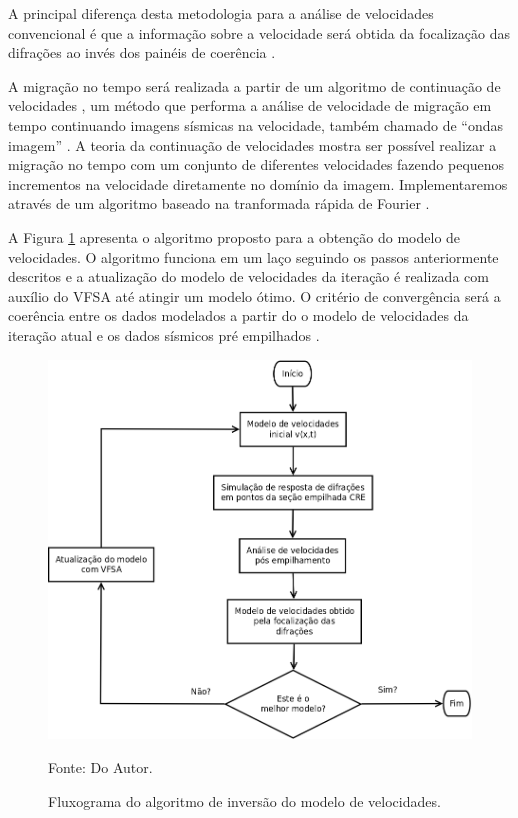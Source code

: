 A principal diferença desta metodologia para a análise
de velocidades convencional é que a informação sobre a velocidade
será obtida da focalização das difrações ao invés dos painéis de coerência \cite{sep_dif}.

A migração no tempo será realizada a partir de um algoritmo de continuação de velocidades \cite{fomel2003a},
um método que performa
a análise de velocidade de migração em tempo continuando imagens sísmicas na velocidade, também chamado de
``ondas imagem'' \cite{hubral1996}. A teoria da continuação de velocidades mostra ser possível realizar a migração no tempo
com um conjunto de diferentes velocidades fazendo pequenos incrementos na velocidade diretamente no domínio da imagem.
Implementaremos através de um algoritmo baseado na tranformada rápida de Fourier \cite{bfomel2003}.

A Figura \ref{fig:8.5} apresenta o algoritmo proposto para a obtenção do modelo de velocidades. O algoritmo funciona em um
laço seguindo os passos anteriormente descritos e a atualização do modelo de velocidades da iteração é realizada com
auxílio do VFSA até atingir um modelo ótimo. O critério de convergência será a coerência entre os dados modelados a partir do
o modelo de velocidades da iteração atual e os dados sísmicos pré empilhados \cite{mesquita}.

\begin{figure}[htb]
\caption{Fluxograma do algoritmo de inversão do modelo de velocidades.}
\begin{center}
\includegraphics[scale=0.30]{images/fluxoVel.png}
\vspace{-0.3cm}
\end{center}
\begin{center}
 Fonte: Do Autor.
\end{center}
\label{fig:8.5}
\end{figure}